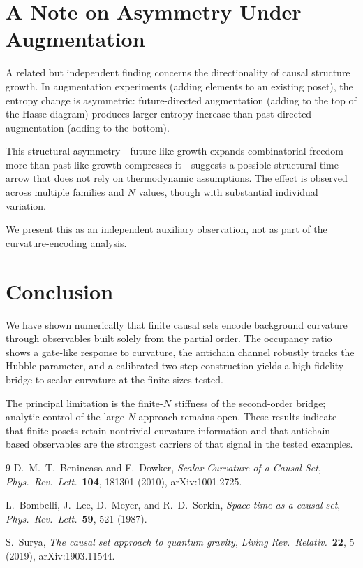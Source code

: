 \documentclass[12pt,a4paper]{article}
\begin{document}
\section{A Note on Asymmetry Under Augmentation}

A related but independent finding concerns the directionality of causal
structure growth.
In augmentation experiments (adding elements to an existing poset), the entropy
change is asymmetric: future-directed augmentation (adding to the top of the
Hasse diagram) produces larger entropy increase than past-directed augmentation
(adding to the bottom).

This structural asymmetry---future-like growth expands combinatorial freedom
more than past-like growth compresses it---suggests a possible structural time
arrow that does not rely on thermodynamic assumptions.
The effect is observed across multiple families and $N$ values, though with
substantial individual variation.

We present this as an independent auxiliary observation, not as part of the
curvature-encoding analysis.

\section{Conclusion}

We have shown numerically that finite causal sets encode background curvature
through observables built solely from the partial order. The occupancy ratio
shows a gate-like response to curvature, the antichain channel robustly tracks
the Hubble parameter, and a calibrated two-step construction yields a
high-fidelity bridge to scalar curvature at the finite sizes tested.

The principal limitation is the finite-$N$ stiffness of the second-order
bridge; analytic control of the large-$N$ approach remains open. These results
indicate that finite posets retain nontrivial curvature information and that
antichain-based observables are the strongest carriers of that signal in the
tested examples.

\begin{thebibliography}{9}
D.~M.~T.~Benincasa and F.~Dowker,
\emph{Scalar Curvature of a Causal Set},
\emph{Phys.\ Rev.\ Lett.}\ \textbf{104}, 181301 (2010),
arXiv:1001.2725.

L.~Bombelli, J.~Lee, D.~Meyer, and R.~D.~Sorkin,
\emph{Space-time as a causal set},
\emph{Phys.\ Rev.\ Lett.}\ \textbf{59}, 521 (1987).

S.~Surya,
\emph{The causal set approach to quantum gravity},
\emph{Living Rev.\ Relativ.}\ \textbf{22}, 5 (2019),
arXiv:1903.11544.
\end{thebibliography}
\end{document}
